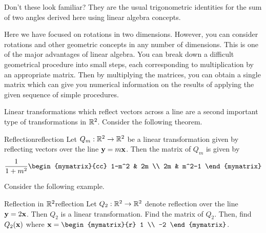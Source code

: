 \begin{solution}
Don't these look familiar? They are the usual trigonometric identities for the sum
of two angles derived here using linear algebra concepts.

\end{solution}

Here we have focused on rotations in two dimensions. However, you can consider rotations and
other geometric concepts in any number of dimensions. This is one of the
major advantages of linear algebra. You can break down a difficult
geometrical procedure into small steps, each corresponding to multiplication
by an appropriate matrix. Then by multiplying the matrices, you can obtain a
single matrix which can give you numerical information on the results of
applying the given sequence of simple procedures.


Linear transformations which reflect vectors across a line are a second important type of transformations in $\mathbb{R}^2$. Consider the following theorem.

\begin{theorem}{Reflection}{reflection}
Let $Q_m: \mathbb{R}^2 \to \mathbb{R}^2$ be a linear transformation given by reflecting vectors over the line $\mbox{\bf y}=m\mbox{\bf x}$. Then the matrix of $Q_m$ is given by 
\[
\frac{1}{1+m^2}
\begin{mymatrix}{cc}
1-m^2 & 2m \\
2m & m^2-1 
\end{mymatrix}
\]
\end{theorem}

Consider the following example. 

\begin{example}{Reflection in $\mathbb{R}^2$}{reflection}
Let $Q_2: \mathbb{R}^2 \to \mathbb{R}^2$ denote reflection over the line $\mbox{\bf y}=2\mbox{\bf x}$. Then $Q_2$ is a linear transformation. Find the matrix of $Q_2$. Then, find $Q_2 (\mbox{\bf x})$ where $\vect{x} = \begin{mymatrix}{r}
1 \\
-2
\end{mymatrix}$. 
\end{example}

